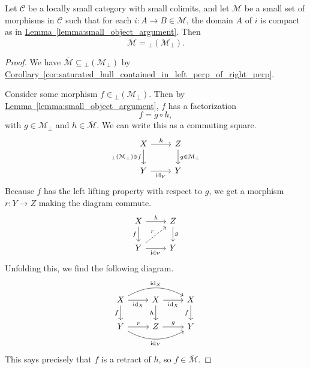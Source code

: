 \documentclass[main.tex]{subfiles}
\begin{document}
\begin{corollary}
  \label{cor:saturated_hull_is_left_perp_of_right_perp}
  Let $\mathcal{C}$ be a locally small category with small colimits, and let $\mathcal{M}$ be a small set of morphisms in $\mathcal{C}$ such that for each $i\colon A \to B \in \mathcal{M}$, the domain $A$ of $i$ is compact as in \hyperref[lemma:small_object_argument]{Lemma~\ref*{lemma:small_object_argument}}. Then
  \begin{equation*}
    \overline{\mathcal{M}} = {}_{\perp}(\mathcal{M}_{\perp}).
  \end{equation*}
\end{corollary}
\begin{proof}
  We have $\overline{\mathcal{M}} \subseteq {}_{\perp}(\mathcal{M}_{\perp})$ by \hyperref[cor:saturated_hull_contained_in_left_perp_of_right_perp]{Corollary~\ref*{cor:saturated_hull_contained_in_left_perp_of_right_perp}}.

  Consider some morphism $f \in {}_{\perp}(\mathcal{M}_{\perp})$. Then by \hyperref[lemma:small_object_argument]{Lemma~\ref*{lemma:small_object_argument}}, $f$ has a factorization
  \begin{equation*}
    f = g \circ h,
  \end{equation*}
  with $g \in \mathcal{M}_{\perp}$ and $h \in \overline{\mathcal{M}}$. We can write this as a commuting square.
  \begin{equation*}
    \begin{tikzcd}
      X
      \arrow[r, "h"]
      \arrow[d, swap, "{}_\perp(\mathcal{M}_{\perp})\ni f"]
      & Z
      \arrow[d, "g \in \mathcal{M}_{\perp}"]
      \\
      Y
      \arrow[r, swap, "\id_{Y}"]
      & Y
    \end{tikzcd}
  \end{equation*}
  Because $f$ has the left lifting property with respect to $g$, we get a morphism $r\colon Y \to Z$ making the diagram commute.
  \begin{equation*}
    \begin{tikzcd}
      X
      \arrow[r, "h"]
      \arrow[d, swap, "f"]
      & Z
      \arrow[d, "g"]
      \\
      Y
      \arrow[r, swap, "\id_{Y}"]
      \arrow[ur, dashed, "r"]
      & Y
    \end{tikzcd}
  \end{equation*}
  Unfolding this, we find the following diagram.
  \begin{equation*}
    \begin{tikzcd}
      X
      \arrow[rr, bend left, "\id_{X}"]
      \arrow[r, swap, "\id_{X}"]
      \arrow[d, swap, "f"]
      & X
      \arrow[r, swap, "\id_{X}"]
      \arrow[d, swap, "h"]
      & X
      \arrow[d, swap, "f"]
      \\
      Y
      \arrow[rr, bend right, swap, "\id_{Y}"]
      \arrow[r, "r"]
      & Z
      \arrow[r, "g"]
      & Y
    \end{tikzcd}
  \end{equation*}
  This says precisely that $f$ is a retract of $h$, so $f \in \overline{\mathcal{M}}$.
\end{proof}
\end{document}
